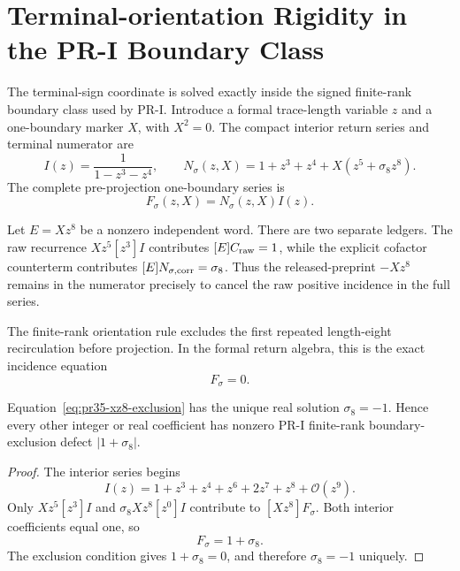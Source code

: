\section{Terminal-orientation Rigidity in the PR-I Boundary Class}
\label{app:terminal-orientation-rigidity}

The terminal-sign coordinate is solved exactly inside the signed finite-rank boundary class used by PR-I.  Introduce a formal trace-length variable $z$ and a one-boundary marker $X$, with $X^2=0$.  The compact interior return series and terminal numerator are
\begin{equation}
 I(z)=\frac{1}{1-z^3-z^4},
 \qquad
 N_{\sigma}(z,X)=1+z^3+z^4+X(z^5+\sigma_8z^8).
\end{equation}
The complete pre-projection one-boundary series is
\begin{equation}
 F_{\sigma}(z,X)=N_{\sigma}(z,X)I(z).
 \label{eq:pr35-full-boundary-return-series}
\end{equation}

Let $E=Xz^8$ be a nonzero independent word.  There are two separate ledgers. The raw recurrence $Xz^5[z^3]I$ contributes $[E]C_{\rm raw}=1$, while the explicit cofactor counterterm contributes $[E]N_{\sigma,\rm corr}=\sigma_8$. Thus the released-preprint $-Xz^8$ remains in the numerator precisely to cancel the raw positive incidence in the full series.

The finite-rank orientation rule excludes the first repeated length-eight recirculation before projection.  In the formal return algebra, this is the exact incidence equation
\begin{equation}
 [Xz^8]F_{\sigma}=0.
 \label{eq:pr35-xz8-exclusion}
\end{equation}

\begin{theorem}
Equation~\eqref{eq:pr35-xz8-exclusion} has the unique real solution $\sigma_8=-1$.  Hence every other integer or real coefficient has nonzero PR-I finite-rank boundary-exclusion defect $|1+\sigma_8|$.
\end{theorem}

\begin{proof}
The interior series begins
\begin{equation}
 I(z)=1+z^3+z^4+z^6+2z^7+z^8+\mathcal O(z^9).
\end{equation}
Only $Xz^5[z^3]I$ and $\sigma_8Xz^8[z^0]I$ contribute to $[Xz^8]F_{\sigma}$.
Both interior coefficients equal one, so
\begin{equation}
 [Xz^8]F_{\sigma}=1+\sigma_8.
\end{equation}
The exclusion condition gives $1+\sigma_8=0$, and therefore
$\sigma_8=-1$ uniquely.
\end{proof}

